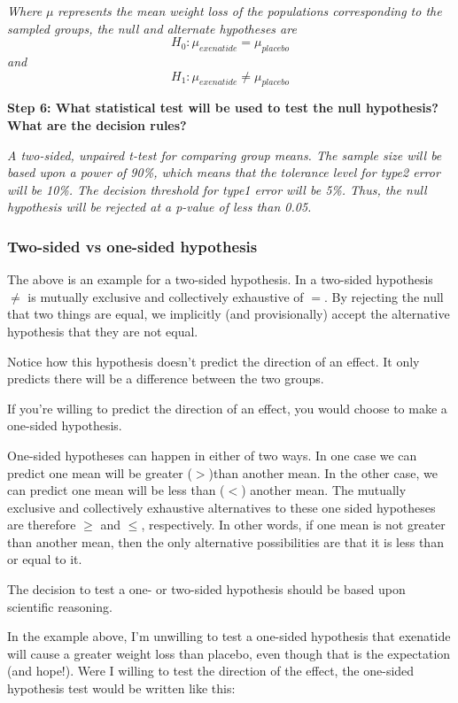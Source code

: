 \documentclass[]{book}
\begin{document}
\emph{Where} \(\mu\) \emph{represents the mean weight loss of the populations corresponding to the sampled groups, the null and alternate hypotheses are} \[H_0:\mu_{exenatide}=\mu_{placebo}\] \emph{and} \[H_1: \mu_{exenatide}\ne\mu_{placebo}\]

\textbf{Step 6: What statistical test will be used to test the null hypothesis? What are the decision rules?}

\emph{A two-sided, unpaired t-test for comparing group means. The sample size will be based upon a power of 90\%, which means that the tolerance level for type2 error will be 10\%. The decision threshold for type1 error will be 5\%. Thus, the null hypothesis will be rejected at a p-value of less than 0.05.}

\hypertarget{two-sided-vs-one-sided-hypothesis}{%
\subsubsection{Two-sided vs one-sided hypothesis}\label{two-sided-vs-one-sided-hypothesis}}

The above is an example for a two-sided hypothesis. In a two-sided hypothesis \(\ne\) is mutually exclusive and collectively exhaustive of \(=\). By rejecting the null that two things are equal, we implicitly (and provisionally) accept the alternative hypothesis that they are not equal.

Notice how this hypothesis doesn't predict the direction of an effect. It only predicts there will be a difference between the two groups.

If you're willing to predict the direction of an effect, you would choose to make a one-sided hypothesis.

One-sided hypotheses can happen in either of two ways. In one case we can predict one mean will be greater (\(>\))than another mean. In the other case, we can predict one mean will be less than (\(<\)) another mean. The mutually exclusive and collectively exhaustive alternatives to these one sided hypotheses are therefore \(\ge\) and \(\le\), respectively. In other words, if one mean is not greater than another mean, then the only alternative possibilities are that it is less than or equal to it.

The decision to test a one- or two-sided hypothesis should be based upon scientific reasoning.

In the example above, I'm unwilling to test a one-sided hypothesis that exenatide will cause a greater weight loss than placebo, even though that is the expectation (and hope!). Were I willing to test the direction of the effect, the one-sided hypothesis test would be written like this:
\end{document}
